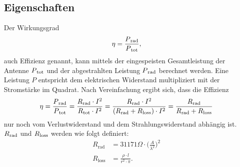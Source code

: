 \subsection{Eigenschaften\label{antennen:antennenEigenschaften}}
Der Wirkungsgrad
%
\begin{equation}
	\eta=\frac{P\textsubscript{rad}}{P\textsubscript{tot}},
	\label{antennen:Wirkungsgrad}
\end{equation}
auch Effizienz genannt, kann mittels der eingespeisten Gesamtleistung
der Antenne $P\textsubscript{tot}$ und der abgestrahlten Leistung
$P\textsubscript{rad}$ berechnet werden. Eine Leistung $P$ entspricht
dem elektrischen Widerstand multipliziert mit der Stromstärke im
Quadrat. Nach Vereinfachung ergibt sich, dass die Effizienz
\begin{equation}
	\eta=\frac{P\textsubscript{rad}}{P\textsubscript{tot}}=\frac{R\textsubscript{rad}\cdot{I^2}}{R\textsubscript{tot}\cdot{I^2}}=\frac{R\textsubscript{rad}\cdot{I^2}}{(R\textsubscript{rad}+R\textsubscript{loss})\cdot{I^2}}=\frac{R\textsubscript{rad}}{R\textsubscript{rad}+R\textsubscript{loss}}
	\label{antennen:Wirkungsgradkomplett}
\end{equation}
nur noch vom Verlustwiderstand und dem Strahlungswiderstand abhängig ist. $R\textsubscript{rad}$ und $R\textsubscript{loss}$ werden wie folgt definiert:
%
%
\begin{align}
	R_{\text{rad}} &= 31171 \Omega \cdot \bigg( \frac{A}{\lambda^2} \bigg)^2 \tag{20.3} \label{antennen:Rrad} \\
	R_{\text{loss}} &= \frac{\rho \cdot l}{r^2 \cdot \pi}. \tag{20.4} \label{antennen:Rloss}
\end{align}

